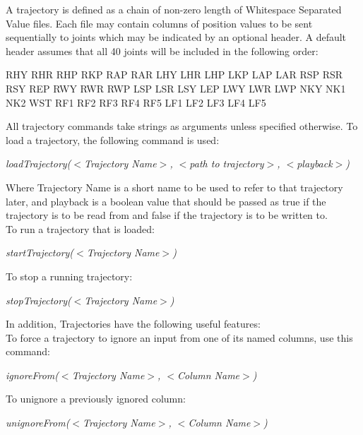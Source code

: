 \documentclass[12pt]{article}
\begin{document}
A trajectory is defined as a chain of non-zero length of Whitespace Separated Value files. Each file may contain columns of position values to be sent sequentially to joints which may be indicated by an optional header. A default header assumes that all 40 joints will be included in the following order:

\begin{center}
RHY RHR RHP RKP RAP RAR LHY LHR LHP LKP LAP LAR RSP RSR RSY REP RWY RWR RWP LSP LSR LSY LEP LWY LWR LWP NKY NK1 NK2 WST RF1 RF2 RF3 RF4 RF5 LF1 LF2 LF3 LF4 LF5
\end{center}

All trajectory commands take strings as arguments unless specified otherwise. To load a trajectory, the following command is used:

    \begin{center}
		\textit{loadTrajectory($<$Trajectory Name$>$, $<$path to trajectory$>$, $<$playback$>$)}
	\end{center}

Where Trajectory Name is a short name to be used to refer to that trajectory later, and playback is a boolean value that should be passed as true if the trajectory is to be read from and false if the trajectory is to be written to.\\
       
To run a trajectory that is loaded:
    \begin{center}
		\textit{startTrajectory($<$Trajectory Name$>$)}
	\end{center}
    
To stop a running trajectory:
	\begin{center}
		\textit{stopTrajectory($<$Trajectory Name$>$)}
	\end{center}
    


In addition, Trajectories have the following useful features:\\

To force a trajectory to ignore an input from one of its named columns, use this command:
    \begin{center}
    	\textit{ignoreFrom($<$Trajectory Name$>$, $<$Column Name$>$)}
    \end{center}

To unignore a previously ignored column:
    \begin{center}
    	\textit{unignoreFrom($<$Trajectory Name$>$, $<$Column Name$>$)}
    \end{center}
\end{document}
